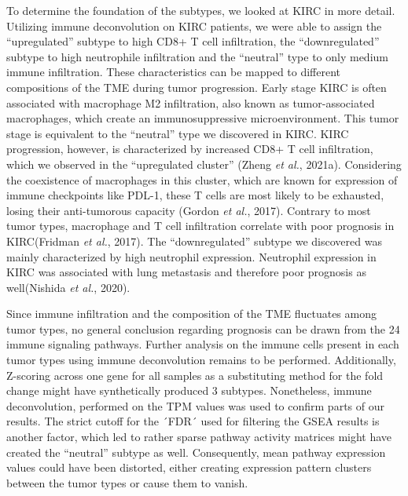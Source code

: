 \documentclass[
  parskip,
  oneside]{scrreprt}
\begin{document}
To determine the foundation of the subtypes, we looked at KIRC in more
detail. Utilizing immune deconvolution on KIRC patients, we were able to
assign the ``upregulated'' subtype to high CD8+ T cell infiltration, the
``downregulated'' subtype to high neutrophile infiltration and the
``neutral'' type to only medium immune infiltration. These
characteristics can be mapped to different compositions of the TME
during tumor progression. Early stage KIRC is often associated with
macrophage M2 infiltration, also known as tumor-associated macrophages,
which create an immunosuppressive microenvironment. This tumor stage is
equivalent to the ``neutral'' type we discovered in KIRC. KIRC
progression, however, is characterized by increased CD8+ T cell
infiltration, which we observed in the ``upregulated cluster'' (Zheng
\emph{et al.}, 2021a). Considering the coexistence of macrophages in
this cluster, which are known for expression of immune checkpoints like
PDL-1, these T cells are most likely to be exhausted, losing their
anti-tumorous capacity (Gordon \emph{et al.}, 2017). Contrary to most
tumor types, macrophage and T cell infiltration correlate with poor
prognosis in KIRC(Fridman \emph{et al.}, 2017). The ``downregulated''
subtype we discovered was mainly characterized by high neutrophil
expression. Neutrophil expression in KIRC was associated with lung
metastasis and therefore poor prognosis as well(Nishida \emph{et al.},
2020).

Since immune infiltration and the composition of the TME fluctuates
among tumor types, no general conclusion regarding prognosis can be
drawn from the 24 immune signaling pathways. Further analysis on the
immune cells present in each tumor types using immune deconvolution
remains to be performed. Additionally, Z-scoring across one gene for all
samples as a substituting method for the fold change might have
synthetically produced 3 subtypes. Nonetheless, immune deconvolution,
performed on the TPM values was used to confirm parts of our results.
The strict cutoff for the ´FDR´ used for filtering the GSEA results is
another factor, which led to rather sparse pathway activity matrices
might have created the ``neutral'' subtype as well. Consequently, mean
pathway expression values could have been distorted, either creating
expression pattern clusters between the tumor types or cause them to
vanish.
\end{document}

